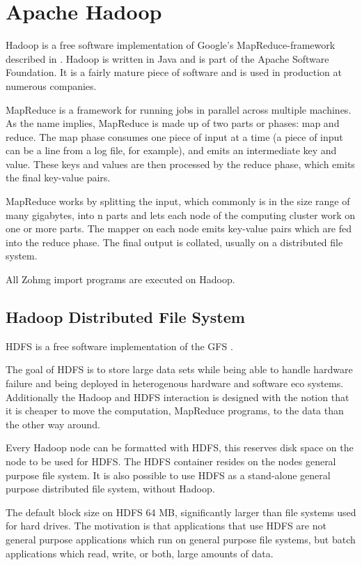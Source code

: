\documentclass[a4paper,10pt]{book}
\begin{document}
\section{Apache Hadoop}

Hadoop is a free software implementation of Google's MapReduce-framework
described in \cite{mapreduce}. Hadoop is written in Java and is part of
the Apache Software Foundation.  It is a fairly mature piece of software
and is used in production at numerous companies. \cite{hadoop}

MapReduce is a framework for running jobs in parallel across multiple
machines. As the name implies, MapReduce is made up of two parts or
phases: map and reduce. The map phase consumes one piece of input at a
time (a piece of input can be a line from a log file, for example), and
emits an intermediate key and value. These keys and values are then
processed by the reduce phase, which emits the final key-value pairs.

MapReduce works by splitting the input, which commonly is in the size
range of many gigabytes, into n parts and lets each node of the computing
cluster work on one or more parts. The mapper on each node emits key-value
pairs which are fed into the reduce phase. The final output is collated,
usually on a distributed file system.

All Zohmg import programs are executed on Hadoop.


\subsection{Hadoop Distributed File System}

HDFS is a free software implementation of the GFS \cite{gfs}.

The goal of HDFS is to store large data sets while being able to handle
hardware failure and being deployed in heterogenous hardware and software
eco systems. Additionally the Hadoop and HDFS interaction is designed with
the notion that it is cheaper to move the computation, MapReduce programs,
to the data than the other way around.

Every Hadoop node can be formatted with HDFS, this reserves disk space on
the node to be used for HDFS. The HDFS container resides on the nodes
general purpose file system. It is also possible to use HDFS as a
stand-alone general purpose distributed file system, without Hadoop.

The default block size on HDFS 64 MB, significantly larger than
file systems used for hard drives. The motivation is that applications
that use HDFS are not general purpose applications which run on general
purpose file systems, but batch applications which read, write, or both,
large amounts of data.
\end{document}

